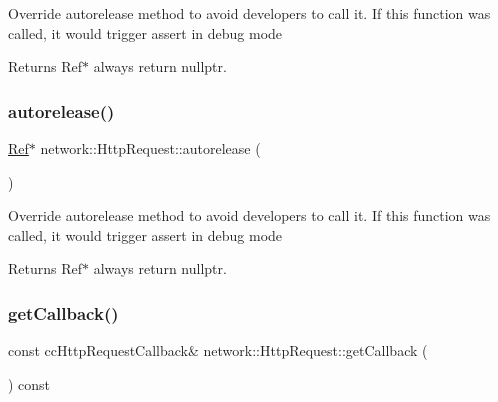 Override autorelease method to avoid developers to call it. If this function was called, it would trigger assert in debug mode

\begin{DoxyReturn}{Returns}
Ref$\ast$ always return nullptr. 
\end{DoxyReturn}
\mbox{\label{classnetwork_1_1HttpRequest_a0fc06041ec6a34d4f92c786a99a91a33}} 
\subsubsection{\texorpdfstring{autorelease()}{autorelease()}\hspace{0.1cm}{\footnotesize\ttfamily [2/2]}}
{\footnotesize\ttfamily \hyperlink{classRef}{Ref}$\ast$ network\+::\+Http\+Request\+::autorelease (\begin{DoxyParamCaption}{ }\end{DoxyParamCaption})\hspace{0.3cm}{\ttfamily [inline]}}

Override autorelease method to avoid developers to call it. If this function was called, it would trigger assert in debug mode

\begin{DoxyReturn}{Returns}
Ref$\ast$ always return nullptr. 
\end{DoxyReturn}
\mbox{\label{classnetwork_1_1HttpRequest_abc46429ca35e9585ddb0a96a744ecee2}} 
\subsubsection{\texorpdfstring{get\+Callback()}{getCallback()}\hspace{0.1cm}{\footnotesize\ttfamily [1/2]}}
{\footnotesize\ttfamily const cc\+Http\+Request\+Callback\& network\+::\+Http\+Request\+::get\+Callback (\begin{DoxyParamCaption}{ }\end{DoxyParamCaption}) const\hspace{0.3cm}{\ttfamily [inline]}}

